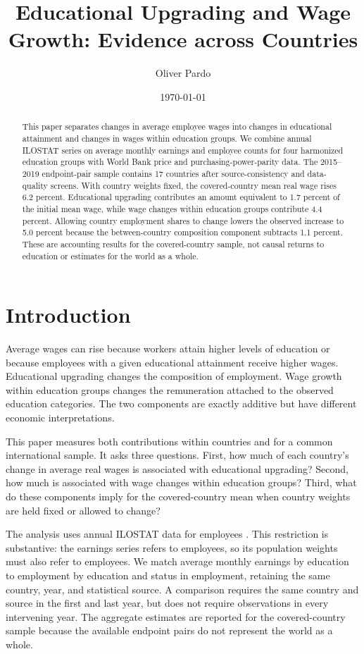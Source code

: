 \documentclass[11pt]{article}
\title{Educational Upgrading and Wage Growth: Evidence across Countries}
\author{Oliver Pardo}
\date{\today}
\begin{document}
\maketitle

\begin{abstract}
This paper separates changes in average employee wages into changes in
educational attainment and changes in wages within education groups. We
combine annual ILOSTAT series on average monthly earnings and employee counts
for four harmonized education groups with World Bank price and
purchasing-power-parity data. The 2015--2019 endpoint-pair sample contains 17
countries after source-consistency and data-quality screens. With country
weights fixed, the covered-country mean real wage rises 6.2 percent.
Educational upgrading contributes an amount equivalent to 1.7 percent of the
initial mean wage, while wage changes within education groups contribute 4.4
percent. Allowing country employment shares to change lowers the observed
increase to 5.0 percent because the between-country composition component
subtracts 1.1 percent. These are accounting results for the covered-country
sample, not causal returns to education or estimates for the world as a whole.
\end{abstract}

\section{Introduction}

Average wages can rise because workers attain higher levels of education or
because employees with a given educational attainment receive higher wages.
Educational upgrading changes the composition of employment. Wage growth
within education groups changes the remuneration attached to the observed
education categories. The two components are exactly additive but have
different economic interpretations.

This paper measures both contributions within countries and for a common
international sample. It asks three questions. First, how much of each
country's change in average real wages is associated with educational
upgrading? Second, how much is associated with wage changes within education
groups? Third, what do these components imply for the covered-country mean
when country weights are held fixed or allowed to change?

The analysis uses annual ILOSTAT data for employees
\citep{ilostat2026}. This restriction is substantive: the earnings series
refers to employees, so its population weights must also refer to employees.
We match average monthly earnings by education to employment by education and
status in employment, retaining the same country, year, and statistical
source. A comparison requires the same country and source in the first and
last year, but does not require observations in every intervening year. The
aggregate estimates are reported for the covered-country sample because the
available endpoint pairs do not represent the world as a whole.
\end{document}
